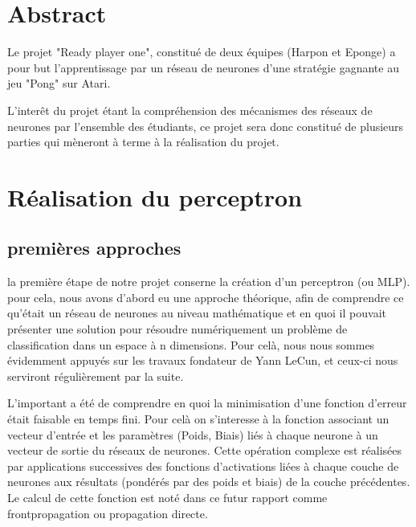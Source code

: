 \documentclass[
    10pt,
    a4paper,
    oneside,
    headinclude,footinclude,
    BCOR=5mm,
    captions=tableabove
]{scrartcl}
\title{\normalfont{\spacedallcaps{Ready-Player-One}}}
\subtitle{Rapport du groupe Harpon}
\author{Martin Lehoux, Pierre Biret \and Sacha Seksik, Loïc Audoin}
\date{\today}
\begin{document}
    
\renewcommand{\sectionmark}[1]{\markright{\spacedlowsmallcaps{#1}}}
\lehead{\mbox{\llap{\small\thepage\kern1em\color{halfgray} \vline}\color{halfgray}\hspace{0.5em}\rightmark\hfil}}
\pagestyle{scrheadings}

\maketitle

\section*{Abstract}
Le projet "Ready player one", constitué de deux équipes (Harpon et Eponge) a pour but l'apprentissage par un réseau de neurones d'une stratégie gagnante au jeu "Pong" sur Atari.

L'interêt du projet étant la compréhension des mécanismes des réseaux de neurones par l'ensemble des étudiants, ce projet sera donc constitué de plusieurs parties qui mèneront à terme à la réalisation du projet.



\newpage
\section{Réalisation du perceptron}


\subsection{premières approches}

la première étape de notre projet conserne la création d'un perceptron (ou MLP). pour cela, nous avons d'abord eu une approche théorique, afin de comprendre ce qu'était un réseau de neurones au niveau mathématique et en quoi il pouvait présenter une solution pour résoudre numériquement un problème de classification dans un espace à n dimensions. Pour celà, nous nous sommes évidemment appuyés sur les travaux fondateur de Yann LeCun, et ceux-ci nous serviront régulièrement par la suite. 

L'important a été de comprendre en quoi la minimisation d'une fonction d'erreur était faisable en temps fini. Pour celà on s'interesse à la fonction associant un vecteur d'entrée et les paramètres (Poids, Biais) liés à chaque neurone à un vecteur de sortie du réseaux de neurones. Cette opération complexe est réalisées par applications successives des fonctions d'activations liées à chaque couche de neurones aux résultats (pondérés par des poids et biais) de la couche précédentes. 
Le calcul de cette fonction est noté dans ce futur rapport comme frontpropagation ou propagation directe.
\end{document}
